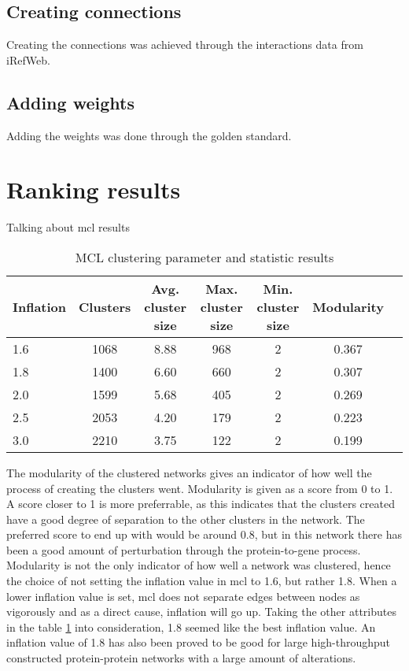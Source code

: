 \subsection{Creating connections}
Creating the connections was achieved through the interactions data from
iRefWeb.

\subsection{Adding weights}
Adding the weights was done through the golden standard.

\section{Ranking results}
Talking about \gls{mcl} results
\hspace*{-2cm}\begin{table}[H]
    \centering
    \begin{tabular}{| l | c | c | c | c | c | c |}
        \hline
        \textbf{Inflation} & \textbf{Clusters} & \textbf{Avg.  cluster size} &
        \textbf{Max. cluster size} & \textbf{Min. cluster size} &
        \textbf{Modularity} \\
        \hline
        1.6 & 1068 & 8.88 & 968 & 2 & 0.367 \\
        1.8 & 1400 & 6.60 & 660 & 2 & 0.307 \\
        2.0 & 1599 & 5.68 & 405 & 2 & 0.269 \\
        2.5 & 2053 & 4.20 & 179 & 2 & 0.223 \\
        3.0 & 2210 & 3.75 & 122 & 2 & 0.199 \\
        \hline
    \end{tabular}
    \caption{MCL clustering parameter and statistic results}
    \label{tab:mcl-inflation}
\end{table}
The modularity of the clustered networks gives an indicator of how well the
process of creating the clusters went. Modularity is given as a score from 0 to
1. A score closer to 1 is more preferrable, as this indicates that the clusters
created have a good degree of separation to the other clusters in the network.
The preferred score to end up with would be around 0.8, but in this network
there has been a good amount of perturbation through the protein-to-gene
process. Modularity is not the only indicator of how well a network was
clustered, hence the choice of not setting the inflation value in \gls{mcl} to
1.6, but rather 1.8. When a lower inflation value is set, \gls{mcl} does not
separate edges between nodes as vigorously and as a direct cause, inflation will
go up. Taking the other attributes in the table \ref{tab:mcl-inflation} into
consideration, 1.8 seemed like the best inflation value. An inflation value of
1.8 has also been proved to be good for large high-throughput constructed
protein-protein networks with a large amount of alterations\cite{mcl-inflation}.

